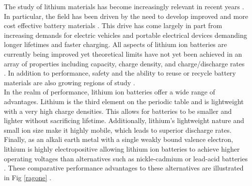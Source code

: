 



 

The study of lithium materials has become increasingly relevant in recent years \cite{nitta_li-ion_2015}.  In particular, the field has been driven by the need to develop improved  and more cost effective battery materials \cite{nitta_li-ion_2015}.  This drive has come largely in part from increasing demands for electric vehicles and portable electrical devices demanding longer lifetimes and faster charging.  All aspects of lithium ion batteries are currently being improved yet theoretical limits have not yet been achieved in an array of properties including capacity, charge density, and charge/discharge rates .  In  addition to performance, safety and the ability to reuse or recycle battery materials are also growing regions of study \cite{gaines_future_2014, doughty_general_2012, balakrishnan_safety_2006}.  \\

In the realm of performance, lithium ion batteries offer a wide range of advantages.  Lithium is the third element on the periodic table and is lightweight  with a very high charge densities.  This allows for batteries to be smaller and lighter without sacrificing lifetime.  Additionally, lithium's lightweight nature and small ion size make it highly mobile, which leads to superior discharge rates.  Finally, as an alkali earth metal with a single weakly bound valence electron, lithium is highly electropositive  allowing lithium ion batteries to achieve higher operating voltages than alternatives such as nickle-cadmium or lead-acid batteries \cite{etacheri_challenges_2011}.  These comparative performance advantages to these alternatives are illustrated in Fig \ref{ragone} \cite{etacheri_challenges_2011}.\\

